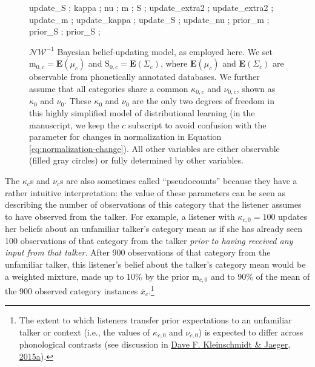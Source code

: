 \documentclass[
  11pt,
  english,
  man,floatsintext]{apa6}
\begin{document}
\begin{figure}
{     {update_S} ; %
     {kappa} ; %
     {nu} ; %
     {m} ; %
     {S} ; %
     {update_extra2} ; %
     {update_extra2} ; %
     {update_m} ; %
     {update_kappa} ; %
     {update_S} ; %
     {update_nu} ; %
     {prior_m} ;
     {prior_S} ;
     {prior_S} ;
  }
  \caption{$\mathcal{NW}^{-1}$ Bayesian belief-updating model, as employed here. We set $\mathrm{m}_{0,c} = \mathbf{E}(\mu_c)$ and $\mathrm{S}_{0,c}=\mathbf{E}(\Sigma_c)$, where $\mathbf{E}(\mu_c)$ and $\mathbf{E}(\Sigma_c)$ are observable from phonetically annotated databases. We further assume that all categories share a common $\kappa_{0,c}$ and $\nu_{0,c}$, shown as $\kappa_{0}$ and $\nu_{0}$. These $\kappa_{0}$ and $\nu_{0}$ are the only two degrees of freedom in this highly simplified model of distributional learning (in the manuscript, we keep the $c$ subscript to avoid confusion with the parameter for changes in normalization in Equation \ref{eq:normalization-change}). All other variables are either observable (filled gray circles) or fully determined by other variables.}\label{fig:model-belief-updating}
\end{figure}

The \(\kappa_{c}\)s and \(\nu_{c}\)s are also sometimes called ``pseudocounts'' because they have a rather intuitive interpretation: the value of these parameters can be seen as describing the number of observations of this category that the listener assumes to have observed from the talker. For example, a listener with \(\kappa_{c,0} = 100\) updates her beliefs about an unfamiliar talker's category mean as if she has already seen 100 observations of that category from the talker \emph{prior to having received any input from that talker}. After 900 observations of that category from the unfamiliar talker, this listener's belief about the talker's category mean would be a weighted mixture, made up to 10\% by the prior \(\mathrm{m}_{c,0}\) and to 90\% of the mean of the 900 observed category instances \(\bar{x}_c\).\footnote{The extent to which listeners transfer prior expectations to an unfamiliar talker or context (i.e., the values of \(\kappa_{c,0}\) and \(\nu_{c,0}\)) is expected to differ across phonological contrasts (see discussion in \protect\hyperlink{ref-kleinschmidt-jaeger2015}{Dave F. Kleinschmidt \& Jaeger, 2015a}).}
\end{document}
